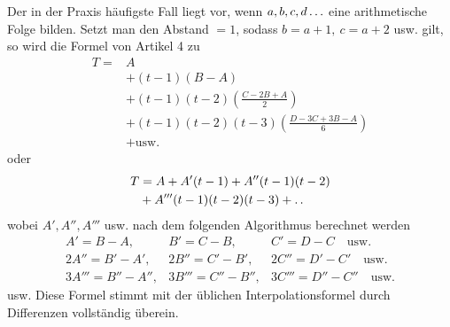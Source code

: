 Der in der Praxis häufigste Fall liegt vor, wenn \(a,b,c,d\mathinner{.\,.\,.}\) eine arithmetische Folge bilden. Setzt man den Abstand \(=1\), sodass \(b=a+1,\ c=a+2\)
usw. gilt, so wird die Formel von Artikel 4 zu
\[
\begin{aligned}
T={}&A\\
&+(t-1)(B-A)\\
&+(t-1)(t-2)\left(\frac{C-2B+A}{2}\right)\\
&+(t-1)(t-2)(t-3)\left(\frac{D-3C+3B-A}{6}\right)\\
&+\text{usw.}
\end{aligned}
\]
oder
\[\begin{aligned}
T&=A+A'(t-1)+A''(t-1)(t-2)\\&+A'''(t-1)(t-2)(t-3)+\mathinner{.\,.}
\end{aligned}\]
wobei \(A',A'',A'''\) usw. nach dem folgenden Algorithmus berechnet werden
\[
\begin{array}{lll}
A'=B-A,&B'=C-B,&C'=D-C\quad\text{usw.}\\
2A''=B'-A',&2B''=C'-B',&2C''=D'-C'\quad\text{usw.}\\
3A'''=B''-A'',&3B'''=C''-B'',&3C'''=D''-C''\quad\text{usw.}
\end{array}
\]
usw. Diese Formel stimmt mit der üblichen Interpolationsformel durch Differenzen vollständig überein.

